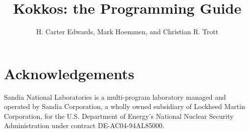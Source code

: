 \documentclass[pdf,12pt,relax]{SANDreport}
\title{Kokkos: the Programming Guide}
\author{H. Carter Edwards, Mark Hoemmen, and Christian R. Trott}
\begin{document}
\maketitle

%
\begin{abstract}
\end{abstract}
\clearpage
\section*{Acknowledgements}

Sandia National Laboratories is a multi-program laboratory managed and operated by Sandia Corporation, a wholly owned subsidiary of Lockheed Martin Corporation, for the U.S. Department of Energy's National Nuclear Security Administration under contract DE-AC04-94AL85000.

\cleardoublepage

\setcounter{tocdepth}{2}
\tableofcontents
\listoffigures
\listoftables

\SANDmain



 \clearpage









\clearpage




\end{document}
